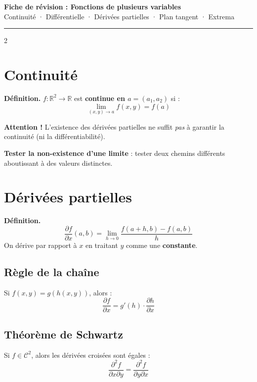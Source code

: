 \documentclass[10pt,a4paper]{article}
\begin{document}
\begin{center}
  {\Large\bfseries\color{bleu} Fiche de révision : Fonctions de plusieurs variables}\\[3pt]
  {\small Continuité · Différentielle · Dérivées partielles · Plan tangent · Extrema}
\end{center}
\noindent\rule{\linewidth}{0.8pt}

\begin{multicols}{2}

\section{Continuité}

\begin{grisbox}
\textbf{Définition.} $f:\mathbb{R}^2\to\mathbb{R}$ est \textbf{continue en $a=(a_1,a_2)$} si :
$$\lim_{(x,y)\to a} f(x,y) = f(a)$$
\end{grisbox}

\begin{alertbox}
\textbf{Attention !} L'existence des dérivées partielles ne suffit \textit{pas} à garantir la continuité (ni la différentiabilité).
\end{alertbox}

\textbf{Tester la non-existence d'une limite} : tester deux chemins différents aboutissant à des valeurs distinctes.

\section{Dérivées partielles}

\begin{grisbox}
\textbf{Définition.}
$$\frac{\partial f}{\partial x}(a,b) = \lim_{h\to 0}\frac{f(a+h,b)-f(a,b)}{h}$$
On dérive par rapport à $x$ en traitant $y$ comme une \textbf{constante}.
\end{grisbox}

\subsection{Règle de la chaîne}
Si $f(x,y)=g(h(x,y))$, alors :
$$\frac{\partial f}{\partial x} = g'(h)\cdot\frac{\partial h}{\partial x}$$

\subsection{Théorème de Schwartz}
Si $f\in\mathcal{C}^2$, alors les dérivées croisées sont égales :
$$\boxed{\frac{\partial^2 f}{\partial x\partial y} = \frac{\partial^2 f}{\partial y\partial x}}$$


\end{multicols}
\end{document}

